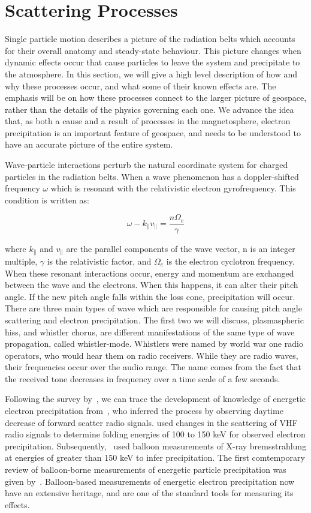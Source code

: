 \section{Scattering Processes}

Single particle motion describes a picture of the radiation belts which accounts for their overall anatomy and steady-state behaviour. This picture changes when dynamic effects occur that cause particles to leave the system and precipitate to the atmosphere. In this section, we will give a high level description of how and why these processes occur, and what some of their known effects are. The emphasis will be on how these processes connect to the larger picture of geospace, rather than the details of the physics governing each one. We advance the idea that, as both a cause and a result of processes in the magnetosphere, electron precipitation is an important feature of geospace, and needs to be understood to have an accurate picture of the entire system. 

Wave-particle interactions perturb the natural coordinate system for charged particles in the radiation belts. When a wave phenomenon has a doppler-shifted frequency $\omega$ which is resonant with the relativistic electron gyrofrequency. This condition is written as:

$$\omega - k_{\parallel}v_{\parallel} = \frac{n\Omega_e}{\gamma}$$

where $k_{\parallel}$ and $v_{\parallel}$ are the parallel components of the wave vector, n is an integer multiple, $\gamma$ is the relativistic factor, and $\Omega_e$ is the electron cyclotron frequency. When these resonant interactions occur, energy and momentum are exchanged between the wave and the electrons. When this happens, it can alter their pitch angle. If the new pitch angle falls within the loss cone, precipitation will occur.  There are three main types of wave which are responsible for causing pitch angle scattering and electron precipitation. The first two we will discuss, plasmaspheric hiss, and whistler chorus, are different manifestations of the same type of wave propagation, called whistler-mode. Whistlers were named by world war one radio operators, who would hear them on radio receivers. While they are radio waves, their frequencies occur over the audio range. The name comes from the fact that the received tone decreases in frequency over a time scale of a few seconds. 


Following the survey by~\cite{Millan2007a}, we can trace the development of knowledge of energetic electron precipitation from~\cite{Bailey1968}, who inferred the process by observing daytime decrease of forward scatter radio signals. \cite{rosenberg1972} used changes in the scattering of VHF radio signals to determine folding energies of 100 to 150 keV for observed electron precipitation. Subsequently,~\cite{parks1979} used balloon measurements of X-ray bremsstrahlung at energies of greater than 150 keV to infer precipitation. The first comtemporary review of balloon-borne measurements of energetic particle precipitation was given by~\cite{parks1993}. Balloon-based measurements of energetic electron precipitation now have an extensive heritage, and are one of the standard tools for measuring its effects. 

